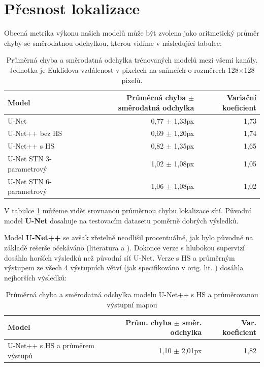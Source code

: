 \section{Přesnost lokalizace}
\label{sec:Chapter62}

Obecná metrika výkonu našich modelů může být zvolena jako aritmetický průměr chyby se směrodatnou odchylkou, kterou vidíme v následující tabulce:
\begin{table}[H]
    \centering
    \begin{tabular}{lrr}
        \toprule
        Model & Průměrná chyba $\pm$ směrodatná odchylka & Variační koeficient \\
        \midrule
	    U-Net & 0,77 $\pm$ 1,33px & 1,73 \\
        U-Net++ bez HS & 0,69 $\pm$ 1,20px & 1,74 \\
        U-Net++ s HS & 0,82 $\pm$ 1,35px & 1,65 \\
        U-Net STN 3-parametrový & 1,02 $\pm $ 1,08px & 1,05 \\
        U-Net STN 6-parametrový & 1,06 $\pm $ 1,08px & 1,02 \\
        \bottomrule   
    \end{tabular}
    \caption[Průměrná chyba a směrodatná odchylka trénovaných modelů]{Průměrná chyba a směrodatná odchylka trénovaných modelů mezi všemi kanály. Jednotka je Euklidova vzdálenost v pixelech na snímcích o rozměrech 128$\times$128 pixelů.}
    \label{fig:mean_std_no_channel}
\end{table}

V tabulce \ref{fig:mean_std_no_channel} můžeme vidět srovnanou průměrnou chybu lokalizace sítí. Původní model \textbf{U-Net} dosahuje na testovacím datasetu poměrně dobrých výsledků. 

Model \textbf{U-Net++} se avšak zřetelně neodlišil procentuálně, jak bylo původně na základě rešerše očekáváno (literatura \cite{unetpp} a \cite{unet_comparison}). Dokonce verze s hlubokou supervizí dosáhla horších výsledků než původní síť U-Net. Verze s HS a průměrným výstupem ze všech 4 výstupních větví (jak specifikováno v orig. lit. \cite{unetpp}) dosáhla nejhorších výsledků:
\begin{table}[H]
    \centering
    \begin{tabular}{lrr}
        \toprule
        Model & Prům. chyba $\pm$ směr. odchylka & Var. koeficient \\
        \midrule
        U-Net++ s HS a průměrem výstupů & 1,10 $\pm$ 2,01px & 1,82 \\
    \end{tabular}
    \caption[Průměrná chyba a směrodatná odchylka modelu původní sítě U-Net++ s HS]{Průměrná chyba a směrodatná odchylka modelu U-Net++ s HS a průměrovanou výstupní mapou}
    \label{fig:mean_std_no_channel_unetpp_fail}
\end{table}

